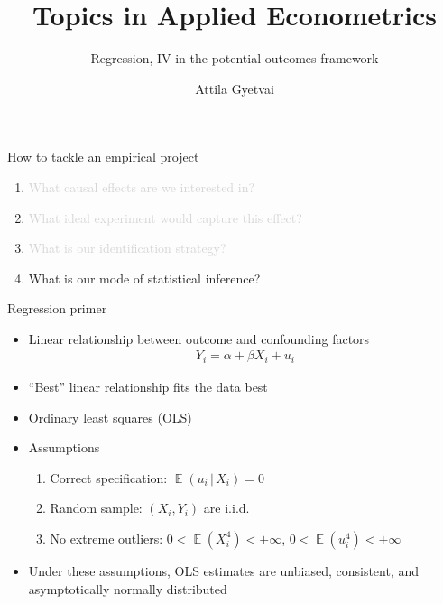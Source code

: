\documentclass[aspectratio=169,compress,handout,t,xcolor=table]{beamer}
\title{Topics in Applied Econometrics}
\subtitle[]{Regression, IV in the potential outcomes framework}
\author[Attila Gyetvai]{Attila Gyetvai}
\institute[]{Duke Economics \\ Summer 2020}
\date{}
\DeclareMathOperator{\E}{\mathbb{E}}                       %
\begin{document}
{
\begin{frame}
  \titlepage
\end{frame}
}
\addtocounter{framenumber}{-1}

\begin{frame}[c]{How to tackle an empirical project}
  \begin{enumerate}
    \addtolength{\itemsep}{0.5\baselineskip}
    \item \textcolor{lightgray}{What causal effects are we interested in?}
    \item \textcolor{lightgray}{What ideal experiment would capture this effect?}
    \item \textcolor{lightgray}{What is our identification strategy?}
    \item What is our mode of statistical inference?
  \end{enumerate}
\end{frame}

\begin{frame}{Regression primer}
  \begin{itemize}
    \item Linear relationship between outcome and confounding factors
    \begin{align*}
      Y_i = \alpha + \beta X_i + u_i
    \end{align*}
    \item ``Best'' linear relationship fits the data best
    \item Ordinary least squares (OLS)
    \item Assumptions
    \begin{enumerate}
      \item Correct specification: \(\E(u_i \,|\, X_i) = 0\)
      \item Random sample: \((X_i, Y_i)\) are i.i.d.
      \item No extreme outliers: \(0 < \E(X_i^4) < +\infty\), \(0 < \E(u_i^4) < +\infty\)
    \end{enumerate}
    \item Under these assumptions, OLS estimates are unbiased, consistent, and \\ asymptotically normally distributed
  \end{itemize}
\end{frame}
\end{document}
